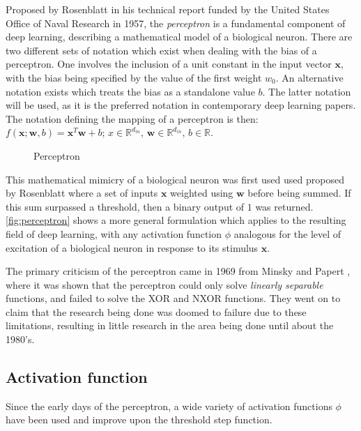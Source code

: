 Proposed by Rosenblatt \cite{Rosenblatt_1957_6098} in his technical
report funded by the United States Office of Naval Research
\cite{doi:10.1177/030631296026003005} in 1957, the \textit{perceptron} is a
fundamental component of deep learning, describing a mathematical model of a
biological neuron. There are two different sets of notation which exist when
dealing with the bias of a perceptron. One involves the inclusion of a unit
constant in the input vector $\mathbf{x}$, with the bias being specified by the
value of the first weight $w_0$. An alternative notation exists which treats the
bias as a standalone value $b$. The latter notation will be used, as it is the
preferred notation in contemporary deep learning papers. The notation defining
the mapping of a perceptron is then: $f(\mathbf{x};\mathbf{w},
b)=\mathbf{x}^T\mathbf{w}+b$; $x\in\mathbb{R}^{d_{in}}$,
$\mathbf{w}\in\mathbb{R}^{d_{in}}$, $b\in\mathbb{R}$.

\begin{figure}[htbp]
    \centering
    
    \caption{Perceptron}
    \label{fig:perceptron}
\end{figure}

This mathematical mimicry of a biological neuron was first used used proposed by
Rosenblatt where a set of inputs $\mathbf{x}$ weighted using $\mathbf{w}$ before
being summed. If this sum surpassed a threshold, then a binary output of $1$ was
returned. \autoref{fig:perceptron} shows a more general formulation which
   applies to the resulting field of deep learning, with any activation function
$\phi$ analogous for the level of excitation of a biological neuron in response
to its stimulus $\mathbf{x}$.

The primary criticism of the perceptron came in 1969 from Minsky and Papert
\cite{minsky69perceptrons}, where it was shown that the perceptron could only
solve \textit{linearly separable} functions, and failed to solve the XOR and
NXOR functions. They went on to claim that the research being done was doomed to
failure due to these limitations, resulting in little research in the area being
done until about the 1980's.

\subsection{Activation function}

Since the early days of the perceptron, a wide variety of activation functions
$\phi$ have been used and improve upon the threshold step function.

